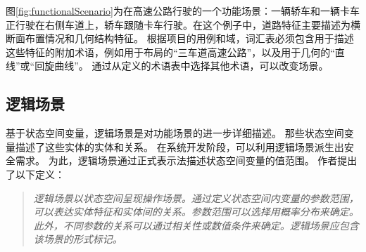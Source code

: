 图\ref{fig:functionalScenario}为在高速公路行驶的一个功能场景：一辆轿车和一辆卡车正行驶在右侧车道上，轿车跟随卡车行驶。在这个例子中，道路特征主要描述为横断面布置情况和几何结构特征。
根据项目的用例和域，词汇表必须包含用于描述这些特征的附加术语，例如用于布局的“三车道高速公路”，以及用于几何的“直线”或“回旋曲线”。
通过从定义的术语表中选择其他术语，可以改变场景。
\subsection{逻辑场景}
基于状态空间变量，逻辑场景是对功能场景的进一步详细描述。
那些状态空间变量描述了这些实体的实体和关系。
在系统开发阶段，可以利用逻辑场景派生出安全需求。
为此，逻辑场景通过正式表示法描述状态空间变量的值范围。
作者提出了以下定义：
\begin{quote}
\textit{
逻辑场景以状态空间呈现操作场景。通过定义状态空间内变量的参数范围，可以表达实体特征和实体间的关系。参数范围可以选择用概率分布来确定。此外，不同参数的关系可以通过相关性或数值条件来确定。逻辑场景应包含该场景的形式标记。
}
\end{quote}

